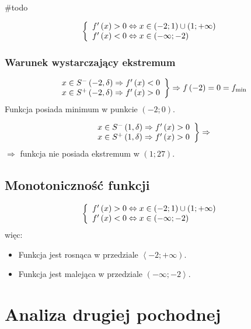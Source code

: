 \documentclass[a4paper,12pt]{article}
\newcommand{\podx}{
		\ensuremath f' \left( x \right)
	}
\begin{document}
\#todo

\[ \left\{
	\begin{array}{l}
		\podx > 0 \Leftrightarrow x \in \left( -2; 1 \right) \cup \left( 1; + \infty \right) \\
		\podx < 0 \Leftrightarrow x \in \left( - \infty; -2 \right)
	\end{array}
\right. \]

\subsubsection*{Warunek wystarczający ekstremum}

\[ \left.
		\begin{array}{l}
			x \in S^- \left( -2, \delta \right) \Rightarrow \podx < 0 \\
			x \in S^+ \left( -2, \delta \right) \Rightarrow \podx > 0
		\end{array}
	\right\} \Rightarrow f \left( -2 \right) = 0 = f_{\text{min}}
\]
Funkcja posiada minimum w punkcie $\left( -2; 0 \right)$.

\[ \left.
		\begin{array}{l}
			x \in S^- \left( 1, \delta \right) \Rightarrow \podx > 0 \\
			x \in S^+ \left( 1, \delta \right) \Rightarrow \podx > 0
		\end{array}
	\right\} \Rightarrow 
\]
$\Rightarrow$ funkcja nie posiada ekstremum w $\left( 1; 27 \right)$.

\subsection{Monotoniczność funkcji}

\[ \left\{
	\begin{array}{l}
		\podx > 0 \Leftrightarrow x \in \left( -2; 1 \right) \cup \left( 1; + \infty \right) \\
		\podx < 0 \Leftrightarrow x \in \left( - \infty; -2 \right)
	\end{array}
\right. \]
więc:
\begin{itemize}
	\item Funkcja jest rosnąca w przedziale $\left\langle -2; +\infty \right)$.
\item Funkcja jest malejąca w przedziale $\left( -\infty ; -2 \right\rangle$.
\end{itemize}

\section{Analiza drugiej pochodnej}
\end{document}
